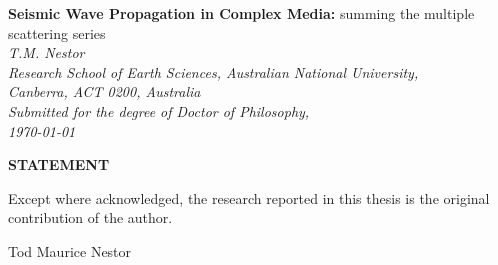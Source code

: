 
%




\oddsidemargin=14.6mm
\evensidemargin=14.6mm
\textwidth=150mm

\nofiles


\thispagestyle{empty}


\begin{flushright}
{ \LARGE \bf Seismic Wave Propagation in Complex Media:}
{\huge  summing the multiple scattering series}\\[3em]
{\large \it T.M. Nestor}\\[1.5em] 
 {\large \it Research School of Earth Sciences, Australian National 
 University, \\ Canberra, ACT { 0200}, Australia}\\[30em]
{\large \it Submitted for the degree of Doctor of Philosophy, \\
\today}
\end{flushright}





\setcounter{page}{1}

\vspace*{30mm}
\begin{center}
{\bf STATEMENT}
\end{center}


\begin{center}
\begin{minipage} {80.0mm}
Except where acknowledged, the research 
reported in this thesis is the original contribution of the author.\newline
\end{minipage}
\end{center}


\begin{center}
\begin{minipage} {80.0mm}
\vspace{20mm}
Tod Maurice Nestor
\end{minipage}
\end{center}
\newpage


